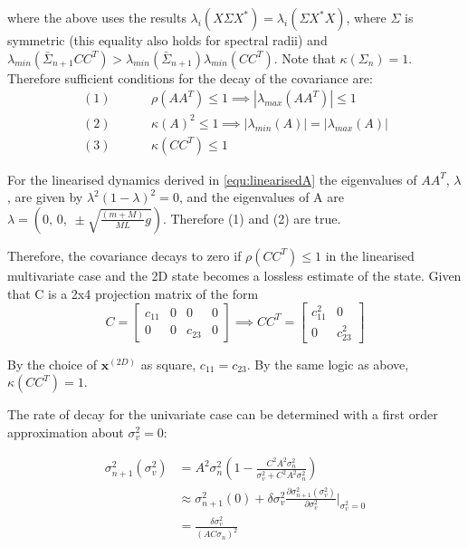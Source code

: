 \documentclass[../main.tex]{subfiles}
\begin{document}
{where the above uses the results $\lambda_i(X\Sigma X^*) = \lambda_i(\Sigma X^*X)$, where $\Sigma$ is symmetric (this equality also holds for spectral radii) and $\lambda_{min}(\bar{\Sigma}_{n+1} C C^T) > \lambda_{min}(\bar{\Sigma}_{n+1})\lambda_{min}(C C^T)$. Note that $\kappa(\Sigma_n)=1$. Therefore sufficient conditions for the decay of the covariance are:
\begin{align}
    (1)& \hspace{1cm} \rho(AA^T) \leq 1 \implies |\lambda_{max}(AA^T)| \leq 1 \\
    (2)& \hspace{1cm} \kappa(A)^2 \leq 1 \implies |\lambda_{min}(A)| = |\lambda_{max}(A)| \\
    (3)& \hspace{1cm} \kappa(CC^T) \leq 1
\end{align}

For the linearised dynamics derived in \cref{equ:linearisedA} the eigenvalues of $AA^T$, $\lambda$, are given by $\lambda^2(1-\lambda)^2 = 0$, and the eigenvalues of A are $\lambda= (0, \,0, \; \pm\sqrt{\frac{(m+M)}{ML}g})$. Therefore (1) and (2) are true.

Therefore, the covariance decays to zero if $\rho(CC^T) \leq 1$ in the linearised multivariate case and the 2D state becomes a lossless estimate of the state. Given that C is a 2x4 projection matrix of the form 
\begin{equation}
C = \begin{bmatrix} c_{11} & 0 & 0 & 0 \\ 0 & 0 & c_{23} & 0 \end{bmatrix} \implies CC^T = \begin{bmatrix} c_{11}^2 & 0 \\ 0 & c_{23}^2 \end{bmatrix}
\end{equation}

By the choice of $\boldsymbol{x}^{(2D)}$ as square, $c_{11} = c_{23}$. By the same logic as above, $\kappa(CC^T) = 1$.


The rate of decay for the univariate case can be determined with a first order approximation about $\sigma_v^2 = 0$:

\begin{align}
    \sigma_{n+1}^2(\sigma_v^2) &= A^2\sigma_n^2(1 - \frac{C^2 A^2\sigma_n^2}{\sigma_v^2 + C^2 A^2 \sigma_n^2}) \\
    &\approx \sigma_{n+1}^2(0) + \delta \sigma_v^2 \frac{\partial \sigma_{n+1}^2(\sigma_v^2)}{\partial \sigma_v^2}|_{\sigma_v^2 = 0} \\
    &= \frac{\delta \sigma_v^2}{(AC\sigma_n)^2}
\end{align}

}
\end{document}
